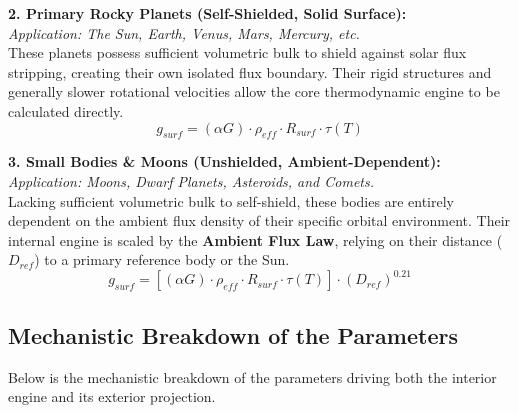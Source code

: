 \documentclass[11pt, a4paper]{article}
\begin{document}
\vspace{0.5em}
\noindent \textbf{2. Primary Rocky Planets (Self-Shielded, Solid Surface):} \\
\textit{Application: The Sun, Earth, Venus, Mars, Mercury, etc.} \\
These planets possess sufficient volumetric bulk to shield against solar flux stripping, creating their own isolated flux boundary. Their rigid structures and generally slower rotational velocities allow the core thermodynamic engine to be calculated directly.
$$g_{surf} = (\alpha G) \cdot \rho_{eff} \cdot R_{surf} \cdot \tau(T)$$

\vspace{0.5em}
\noindent \textbf{3. Small Bodies \& Moons (Unshielded, Ambient-Dependent):} \\
\textit{Application: Moons, Dwarf Planets, Asteroids, and Comets.} \\
Lacking sufficient volumetric bulk to self-shield, these bodies are entirely dependent on the ambient flux density of their specific orbital environment. Their internal engine is scaled by the \textbf{Ambient Flux Law}, relying on their distance ($D_{ref}$) to a primary reference body or the Sun.
$$g_{surf} = \left[ (\alpha G) \cdot \rho_{eff} \cdot R_{surf} \cdot \tau(T) \right] \cdot (D_{ref})^{0.21}$$

\vspace{1.5em}
\subsection{Mechanistic Breakdown of the Parameters}
Below is the mechanistic breakdown of the parameters driving both the interior engine and its exterior projection. 
\end{document}
